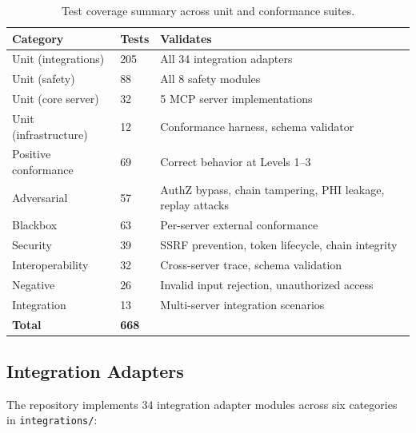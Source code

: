 \documentclass{article}
\begin{document}
\begin{table}[H]
\centering
\caption{Test coverage summary across unit and conformance suites.}
\label{tab:test-coverage}
\small
\begin{tabularx}{\textwidth}{@{}L{3cm}R{1.5cm}L{7cm}@{}}
\toprule
\textbf{Category} & \textbf{Tests} & \textbf{Validates} \\
\midrule
Unit (integrations) & 205 & All 34 integration adapters \\
Unit (safety) & 88 & All 8 safety modules \\
Unit (core server) & 32 & 5 MCP server implementations \\
Unit (infrastructure) & 12 & Conformance harness, schema validator \\
Positive conformance & 69 & Correct behavior at Levels 1--3 \\
Adversarial & 57 & AuthZ bypass, chain tampering, PHI leakage, replay attacks \\
Blackbox & 63 & Per-server external conformance \\
Security & 39 & SSRF prevention, token lifecycle, chain integrity \\
Interoperability & 32 & Cross-server trace, schema validation \\
Negative & 26 & Invalid input rejection, unauthorized access \\
Integration & 13 & Multi-server integration scenarios \\
\midrule
\textbf{Total} & \textbf{668} & \\
\bottomrule
\end{tabularx}
\end{table}

\subsection{Integration Adapters}

The repository implements 34 integration adapter modules across six categories in \texttt{integrations/}:
\end{document}
